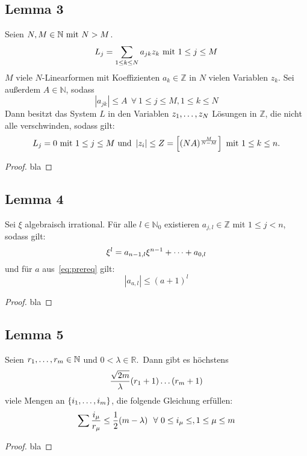 
\subsection{Lemma 3}
    \label{subsec:lemma3}
    Seien $N, M \in \mathbb{N} \ \textrm{mit}\  N > M$.
    \begin{equation*}
        L_j = \sum_{1 \leq k \leq N} a_{jk} z_k \ \textrm{mit}\  1 \leq j \leq M
    \end{equation*}
    $M$ viele $N$-Linearformen mit Koeffizienten $a_k \in \mathbb{Z}$ in $N$ vielen Variablen $z_k$.
    \textrm{Sei außerdem} $A \in \mathbb{N}$, sodass
    \begin{equation*}
        \left| a_{jk} \right| \leq A \ \ \forall \ 1 \leq j \leq M, 1 \leq k \leq N
    \end{equation*}
    \textrm{Dann besitzt das System $L$ in den Variablen $z_1, \dots, z_N$ Lösungen in $\mathbb{Z}$, die nicht alle
    verschwinden, sodass gilt:}
    \begin{equation*}
        L_j = 0 \ \textrm{mit}\  1 \leq j \leq M \ \textrm{und}\  \left| z_i \right| \leq Z = \left[ (NA)^{\frac{M}{N-M}} \right]
        \ \textrm{mit}\  1 \leq k \leq n.
    \end{equation*}
    \begin{proof}
        bla
    \end{proof}

\subsection{Lemma 4}
    \label{subsec:lemma4}
    \textrm{Sei $\xi$ algebraisch irrational. Für alle $l \in \mathbb{N}_0$ existieren $a_{j,l} \in \mathbb{Z}$ mit $1
    \leq j < n$, sodass gilt:}
    \begin{equation*}
        \xi^l = a_{n-1, l}\xi^{n-1} + \dots + a_{0,l}
    \end{equation*}
    \textrm{und für $a$ aus~\eqref{eq:prereq} gilt:}
    \begin{equation*}
        \left| a_{a,l} \right| \leq (a + 1)^l
    \end{equation*}
    \begin{proof}
        bla
    \end{proof}

\subsection{Lemma 5}
    \label{subsec:lemma5}
    \textrm{Seien $r_1, \dots, r_m \in \mathbb{N}$ und $0 < \lambda \in \mathbb{R}$.\ Dann gibt es höchstens}
    \begin{equation*}
        \frac{\sqrt{2m}}{\lambda} (r_1 + 1) \dots (r_m +1)
    \end{equation*}
    \textrm{viele Mengen an $\{ i_1, \dots, i_m \}$, die folgende Gleichung erfüllen:}
    \begin{equation*}
        \sum \frac{i_\mu}{r_\mu} \leq \frac{1}{2} (m - \lambda) \ \ \forall \ 0 \leq i_\mu \leq, 1 \leq \mu \leq m
    \end{equation*}
    \begin{proof}
        bla
    \end{proof}
    
